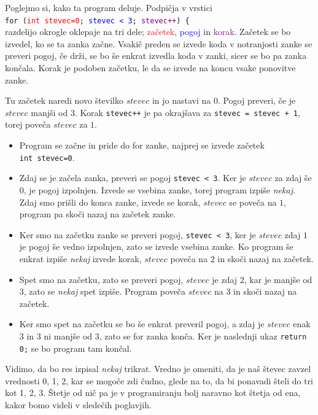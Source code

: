 \documentclass{book}
\begin{document}
Poglejmo si, kako ta program deluje. Podpičja v vrstici \\
\texttt{for~({\textcolor{red}{int~stevec=0}};~\textcolor{blue}{stevec~<~3};~\textcolor{purple}{stevec++})~\{} \\
razdelijo okrogle oklepaje na tri dele; \textcolor{red}{začetek},
\textcolor{blue}{pogoj} in \textcolor{purple}{korak}.
Začetek se bo izvedel, ko se ta zanka začne. Vsakič preden se izvede koda
v notranjosti zanke se preveri pogoj, če drži,
se bo še enkrat izvedla koda v zanki, sicer se bo pa zanka končala.
Korak je podoben začetku, le da se izvede na koncu vsake ponovitve zanke.

Tu začetek naredi novo številko $stevec$ in jo nastavi na $0$.
Pogoj preveri, če je $stevec$ manjši od $3$. Korak \texttt{stevec++} je pa
okrajšava za \texttt{stevec = stevec + 1}, torej poveča $stevec$ za $1$.

\begin{itemize}
	\item Program se začne in pride do for zanke,
	najprej se izvede začetek \texttt{int~stevec=0}.
	\item Zdaj se je začela zanka, preveri se pogoj \texttt{stevec~<~3}.
	Ker je $stevec$ za zdaj še $0$, je pogoj izpolnjen. Izvede se vsebina zanke,
	torej program izpiše \emph{nekaj}. Zdaj smo prišli do konca zanke,
	izvede se korak, $stevec$ se poveča na $1$, program pa skoči nazaj na
	začetek zanke.
	\item Ker smo na začetku zanke se preveri pogoj, \texttt{stevec~<~3},
	ker je $stevec$ zdaj $1$ je pogoj še vedno izpolnjen, zato se izvede
	vsebina zanke. Ko program še enkrat izpiše \emph{nekaj} izvede korak,
	$stevec$ poveča na $2$ in skoči nazaj na začetek.
	\item Spet smo na začetku, zato se preveri pogoj, $stevec$ je zdaj $2$,
	kar je manjše od $3$, zato se \emph{nekaj} spet izpiše. Program poveča
	$stevec$ na $3$ in skoči nazaj na začetek.
	\item Ker smo spet na začetku se bo še enkrat preveril pogoj,
	a zdaj je $stevec$ enak $3$ in $3$ ni manjše od $3$,
	zato se for zanka konča. Ker je naslednji ukaz \texttt{return 0;} se bo
	program tam končal.
\end{itemize}

Vidimo, da bo res izpisal \emph{nekaj} trikrat. Vredno je omeniti,
da je naš števec zavzel vrednosti 0, 1, 2, kar se mogoče zdi čudno, glede na
to, da bi ponavadi šteli do tri kot 1, 2, 3.
Štetje od nič pa je v programiranju bolj naravno kot štetja od ena, kakor bomo
videli v sledečih poglavjih.
\end{document}
